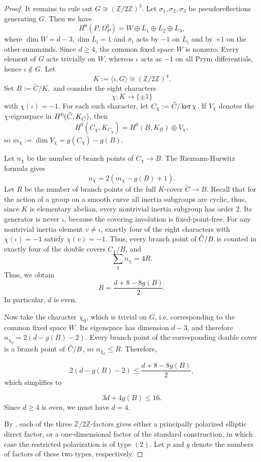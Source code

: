 \documentclass{article}
\numberwithin{equation}{section}
\newcommand{\ZZ}{\mathbb Z}
\newcommand{\tC}{\Tilde{C}}
\begin{document}
\begin{proof}
It remains to rule out $G \cong (\ZZ/2\ZZ)^3$. Let $\sigma_1, \sigma_2, \sigma_3$ be pseudoreflections generating $G$. Then we have $$H^0(P,\Omega_P^1)=W\oplus L_1\oplus L_2\oplus L_3,$$
where $\dim W=d-3, \dim L_i=1$ and $\sigma_i$ acts by $-1$ on $L_i$ and by $+1$ on the other summands. Since $d\geq4$, the common fixed space $W$ is nonzero. Every element of $G$ acts trivially on $W$, whereas $\iota$ acts as $-1$ on all Prym differentials, hence $\iota\notin G$. Let $$K:=\langle\iota,G\rangle\cong(\ZZ/2\ZZ)^4.$$
Set $B:=\widetilde C/K,$ and consider the eight characters $$\chi: K\longrightarrow\{\pm1\}$$
with $\chi(\iota)=-1$. For each such character, let $C_\chi:=\tC/\ker\chi$. If $V_\chi$ denotes the $\chi$-eigenspace in $H^0(\tC,K_{\tC})$, then $$ H^0(C_\chi,K_{C_\chi})=H^0(B,K_B)\oplus V_\chi,$$
so $m_{\chi} := \dim V_\chi=g(C_\chi)-g(B).$

Let $n_\chi$ be the number of branch points of $C_\chi\to B$. The Riemann-Hurwitz formula gives $$n_\chi=2(m_\chi-g(B)+1).$$ Let $R$ be the number of branch points of the full $K$-cover $\widetilde C\to B$. Recall that for the action of a group on a smooth curve all inertia subgroups are cyclic, thus, since $K$ is elementary abelian, every nontrivial inertia subgroup has order $2$. Its generator is never $\iota$, because the covering involution is fixed-point-free. For any nontrivial inertia element $v\neq\iota$, exactly four of the eight characters with $\chi(\iota)=-1$ satisfy $\chi(v)=-1$. Thus, every branch point of $\tC/B$ is counted in exactly four of the double covers $C_\chi/B$, and
$$\sum_\chi n_\chi=4R.$$
Thus, we obtain $$R=\frac{d+8-8g(B)}{2}.$$ In particular, $d$ is even.

Now take the character $\chi_0$, which is trivial on $G$, i.e. corresponding to the common fixed space $W$. Its eigenspace has dimension $d-3$, and therefore $n_{\chi_0}=2(d-g(B)-2).$
Every branch point of the corresponding double cover is a branch point of $\tC/B$, so $n_{\chi_0}\leq R$. Therefore,

$$2(d-g(B)-2)\leq\frac{d+8-8g(B)}{2},$$
which simplifies to

$$3d+4g(B)\leq16.$$
Since $d\geq4$ is even, we must have $d = 4$.

By \cite[Theorem 3.5 and Lemma 3.6]{ALA}, each of the three $\ZZ/2\ZZ$-factors gives either a principally
polarized elliptic direct factor, or a one-dimensional factor of the standard
construction, in which case the restricted polarization is of type $(2)$.
Let $p$ and $q$ denote the numbers of factors of these two types,
respectively. 


\end{proof}
\end{document}
